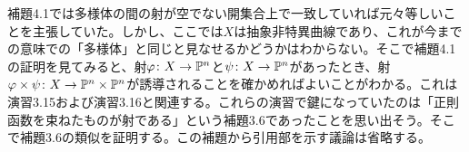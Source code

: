 \begin{rem}
  補題4.1では多様体の間の射が空でない開集合上で一致していれば元々等しいことを主張していた。しかし、ここでは$X$は抽象非特異曲線であり、これが今までの意味での「多様体」と同じと見なせるかどうかはわからない。そこで補題4.1の証明を見てみると、射$\vp \colon X \to \P^n$と$\psi \colon X \to \P^n$があったとき、射$\vp \tm \psi \colon X \to \P^n \tm \P^n$が誘導されることを確かめればよいことがわかる。これは演習3.15および演習3.16と関連する。これらの演習で鍵になっていたのは「正則函数を束ねたものが射である」という補題3.6であったことを思い出そう。そこで補題3.6の類似を証明する。この補題から引用部を示す議論は省略する。
  \end{rem}
  \begin{comment}
  \lem{
  (閉部分集合とアファイン座標環のイデアルの対応) \\
  $Y \subset \A^n$をアファイン多様体とする。部分集合$F \subset Y$があるとする。このとき、次は同値。
  \begin{description}
    \item[(1)] $F$は$Y$の閉部分集合。
    \item[(2)] ある$A(Y)$のイデアル$D$が存在して、
    \[
F = Z(D) = \setmid{x \in Y}{\forall f \in D \; f(x) = 0}
    \]
    が成り立つ。
  \end{description}
  }
  \begin{proof} ${}$
    \begin{description}
      \item[(1)$\To$(2)] $Y \clsub \A^n$より、$k[x_1, \cdots , x_n]$のイデアル$J$であって、$F = Z(J)$なるものがある。このとき
      \begin{align*}
        Z(J) \subset Y &\iff Z(J) \subset Z(I(Y)) \\
        &\iff I(Y) \subset I(Z(J)) \\
        &\iff I(Y) \subset \sqrt{J}
      \end{align*}
      より、$I(Y) \subset \sqrt{J}$がわかる。そこで$D = \sqrt{J} / I(Y)$とおけば条件を満たすことはあきらか。
      \item[(2)$\To$(1)] $D \subset A(Y)$を$k[x_1, \cdots , x_n]$のイデアル$J$に持ち上げる。$I(Y) \subset J$である。
      このとき$F = Z(J) \subset Y$であることをみるのはやさしい。よって$F \clsub Y$である。
    \end{description}
  \end{proof}
\end{comment}
